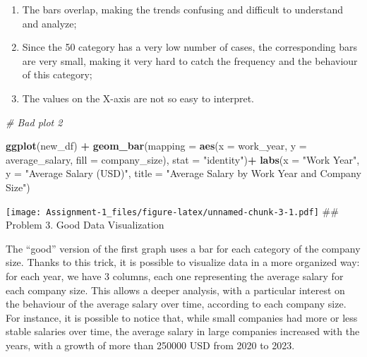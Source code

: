 \documentclass[
]{article}
\newenvironment{Shaded}{\begin{snugshade}}{\end{snugshade}}
\newcommand{\AttributeTok}[1]{\textcolor[rgb]{0.13,0.29,0.53}{#1}}
\newcommand{\CommentTok}[1]{\textcolor[rgb]{0.56,0.35,0.01}{\textit{#1}}}
\newcommand{\FunctionTok}[1]{\textcolor[rgb]{0.13,0.29,0.53}{\textbf{#1}}}
\newcommand{\NormalTok}[1]{#1}
\newcommand{\SpecialCharTok}[1]{\textcolor[rgb]{0.81,0.36,0.00}{\textbf{#1}}}
\newcommand{\StringTok}[1]{\textcolor[rgb]{0.31,0.60,0.02}{#1}}
\begin{document}
\begin{enumerate}
    \item The bars overlap, making the trends confusing and difficult to understand and analyze;
    \item Since the 50 category has a very low number of cases, the corresponding bars are very small, making it very hard to catch the frequency and the behaviour of this category;
    \item The values on the X-axis are not so easy to interpret.
\end{enumerate}
\newline

\begin{Shaded}
\begin{Highlighting}[]
\CommentTok{\# Bad plot 2}

\FunctionTok{ggplot}\NormalTok{(new\_df) }\SpecialCharTok{+}
  \FunctionTok{geom\_bar}\NormalTok{(}\AttributeTok{mapping =} \FunctionTok{aes}\NormalTok{(}\AttributeTok{x =}\NormalTok{ work\_year, }\AttributeTok{y =}\NormalTok{ average\_salary, }\AttributeTok{fill =}\NormalTok{ company\_size), }\AttributeTok{stat =} \StringTok{"identity"}\NormalTok{)}\SpecialCharTok{+}
  \FunctionTok{labs}\NormalTok{(}\AttributeTok{x =} \StringTok{"Work Year"}\NormalTok{, }\AttributeTok{y =} \StringTok{"Average Salary (USD)"}\NormalTok{, }\AttributeTok{title =} \StringTok{"Average Salary by Work Year and Company Size"}\NormalTok{)}
\end{Highlighting}
\end{Shaded}

\texttt{[image: Assignment-1\_files/figure-latex/unnamed-chunk-3-1.pdf]}
\#\# Problem 3. Good Data Visualization

The ``good'' version of the first graph uses a bar for each category of
the company size. Thanks to this trick, it is possible to visualize data
in a more organized way: for each year, we have 3 columns, each one
representing the average salary for each company size. This allows a
deeper analysis, with a particular interest on the behaviour of the
average salary over time, according to each company size. For instance,
it is possible to notice that, while small companies had more or less
stable salaries over time, the average salary in large companies
increased with the years, with a growth of more than 250000 USD from
2020 to 2023. \newline
\end{document}
